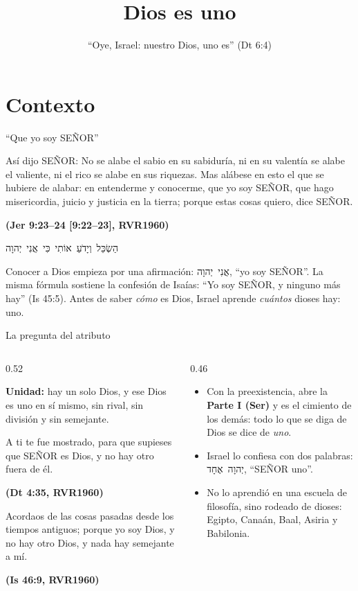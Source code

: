\documentclass[hyperref={bookmarks=false},aspectratio=169]{beamer}
\title[Dios es uno]{\bfseries{Dios es uno}}
\subtitle{``Oye, Israel: \SENOR{} nuestro Dios, \SENOR{} uno es'' (Dt 6:4)}
\author{}\institute{}\date{}
\newcommand{\heb}[1]{\mbox{\foreignlanguage{hebrew}{#1}}}
\newcommand{\SENOR}{S{\fontsize{0.78em}{1em}\selectfont EÑOR}}
\newcommand{\fuente}[1]{\par\hfill{\upshape\bfseries\footnotesize\textcolor{azul}{#1}}}
\newcommand{\destacar}[1]{\textbf{\textcolor{azul}{#1}}}
\begin{document}
\frame{\titlepage}


\section{Contexto}

\begin{frame}{``Que yo soy \SENOR''}
\begin{cita}Así dijo \SENOR: No se alabe el sabio en su sabiduría, ni en su valentía se alabe el valiente, ni el rico se alabe en sus riquezas. Mas alábese en esto el que se hubiere de alabar: en entenderme y conocerme, que yo soy \SENOR, que hago misericordia, juicio y justicia en la tierra; porque estas cosas quiero, dice \SENOR.\fuente{(Jer 9:23--24 [9:22--23], RVR1960)}\end{cita}
\begin{center}\heb{הַשְׂכֵּל וְיָדֹעַ אוֹתִי כִּי אֲנִי יְהוָה}\end{center}
\small\RaggedRight Conocer a Dios empieza por una afirmación: \heb{אֲנִי יְהוָה}, ``yo soy \SENOR''. La misma fórmula sostiene la confesión de Isaías: ``Yo soy \SENOR, y ninguno más hay'' (Is 45:5). Antes de saber \emph{cómo} es Dios, Israel aprende \emph{cuántos} dioses hay: uno.
\end{frame}

\begin{frame}{La pregunta del atributo}
\begin{columns}[c,onlytextwidth]
\begin{column}{0.52\textwidth}
\begin{tcolorbox}[colback=papiro,colframe=azul,boxrule=1pt,arc=3pt]
\small\textbf{Unidad:} hay un solo Dios, y ese Dios es uno en sí mismo, sin rival, sin división y sin semejante.
\end{tcolorbox}
\begin{cita}A ti te fue mostrado, para que supieses que \SENOR{} es Dios, y no hay otro fuera de él.\fuente{(Dt 4:35, RVR1960)}\end{cita}
\begin{cita}Acordaos de las cosas pasadas desde los tiempos antiguos; porque yo soy Dios, y no hay otro Dios, y nada hay semejante a mí.\fuente{(Is 46:9, RVR1960)}\end{cita}
\end{column}
\begin{column}{0.46\textwidth}\small
\begin{itemize}
\item Con la preexistencia, abre la \destacar{Parte I (Ser)} y es el cimiento de los demás: todo lo que se diga de Dios se dice de \emph{uno}.
\item Israel lo confiesa con dos palabras: \heb{יְהוָה אֶחָד}, ``\SENOR{} uno''.
\item No lo aprendió en una escuela de filosofía, sino rodeado de dioses: Egipto, Canaán, Baal, Asiria y Babilonia.
\end{itemize}
\end{column}
\end{columns}
\end{frame}
\end{document}
